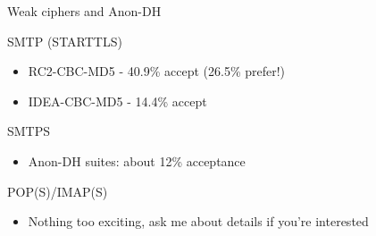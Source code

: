 \begin{frame}{Weak ciphers and Anon-DH}

\begin{block}{SMTP (STARTTLS)}

\begin{itemize}
\itemsep1pt\parskip0pt
\item
  RC2-CBC-MD5 - 40.9\% accept (26.5\% prefer!)
\item
  IDEA-CBC-MD5 - 14.4\% accept
\end{itemize}

\end{block}

\begin{block}{SMTPS}

\begin{itemize}
\itemsep1pt\parskip0pt
\item
  Anon-DH suites: about 12\% acceptance
\end{itemize}

\end{block}

\begin{block}{POP(S)/IMAP(S)}

\begin{itemize}
\itemsep1pt\parskip0pt
\item
  Nothing too exciting, ask me about details if you're interested
\end{itemize}

\end{block}

\end{frame}

